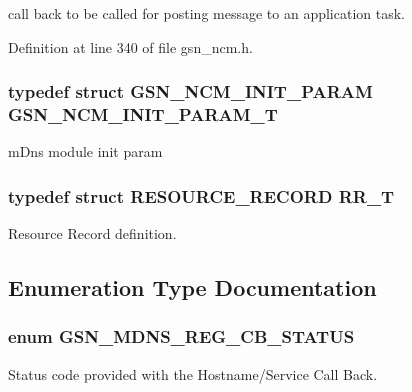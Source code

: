 call back to be called for posting message to an application task. 



Definition at line 340 of file gsn\_\-ncm.h.

\hypertarget{a00668_ga82bd88bbe87405a2e10adc0ee4645d7f}{
\subsubsection[{GSN\_\-NCM\_\-INIT\_\-PARAM\_\-T}]{\setlength{\rightskip}{0pt plus 5cm}typedef struct {\bf GSN\_\-NCM\_\-INIT\_\-PARAM} {\bf GSN\_\-NCM\_\-INIT\_\-PARAM\_\-T}}}
\label{a00668_ga82bd88bbe87405a2e10adc0ee4645d7f}


mDns module init param 

\hypertarget{a00668_ga049805b69be0964873d9f51f9f783813}{
\subsubsection[{RR\_\-T}]{\setlength{\rightskip}{0pt plus 5cm}typedef struct {\bf RESOURCE\_\-RECORD} {\bf RR\_\-T}}}
\label{a00668_ga049805b69be0964873d9f51f9f783813}


Resource Record definition. 



\subsection{Enumeration Type Documentation}
\hypertarget{a00668_ga4736a957266d4e3ba37c9d5ec86beec8}{
\subsubsection[{GSN\_\-MDNS\_\-REG\_\-CB\_\-STATUS}]{\setlength{\rightskip}{0pt plus 5cm}enum {\bf GSN\_\-MDNS\_\-REG\_\-CB\_\-STATUS}}}
\label{a00668_ga4736a957266d4e3ba37c9d5ec86beec8}


Status code provided with the Hostname/Service Call Back. 

